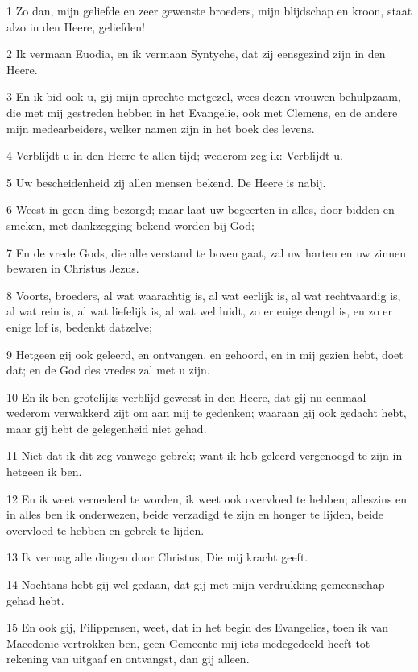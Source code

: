\par 1 Zo dan, mijn geliefde en zeer gewenste broeders, mijn blijdschap en kroon, staat alzo in den Heere, geliefden!
\par 2 Ik vermaan Euodia, en ik vermaan Syntyche, dat zij eensgezind zijn in den Heere.
\par 3 En ik bid ook u, gij mijn oprechte metgezel, wees dezen vrouwen behulpzaam, die met mij gestreden hebben in het Evangelie, ook met Clemens, en de andere mijn medearbeiders, welker namen zijn in het boek des levens.
\par 4 Verblijdt u in den Heere te allen tijd; wederom zeg ik: Verblijdt u.
\par 5 Uw bescheidenheid zij allen mensen bekend. De Heere is nabij.
\par 6 Weest in geen ding bezorgd; maar laat uw begeerten in alles, door bidden en smeken, met dankzegging bekend worden bij God;
\par 7 En de vrede Gods, die alle verstand te boven gaat, zal uw harten en uw zinnen bewaren in Christus Jezus.
\par 8 Voorts, broeders, al wat waarachtig is, al wat eerlijk is, al wat rechtvaardig is, al wat rein is, al wat liefelijk is, al wat wel luidt, zo er enige deugd is, en zo er enige lof is, bedenkt datzelve;
\par 9 Hetgeen gij ook geleerd, en ontvangen, en gehoord, en in mij gezien hebt, doet dat; en de God des vredes zal met u zijn.
\par 10 En ik ben grotelijks verblijd geweest in den Heere, dat gij nu eenmaal wederom verwakkerd zijt om aan mij te gedenken; waaraan gij ook gedacht hebt, maar gij hebt de gelegenheid niet gehad.
\par 11 Niet dat ik dit zeg vanwege gebrek; want ik heb geleerd vergenoegd te zijn in hetgeen ik ben.
\par 12 En ik weet vernederd te worden, ik weet ook overvloed te hebben; alleszins en in alles ben ik onderwezen, beide verzadigd te zijn en honger te lijden, beide overvloed te hebben en gebrek te lijden.
\par 13 Ik vermag alle dingen door Christus, Die mij kracht geeft.
\par 14 Nochtans hebt gij wel gedaan, dat gij met mijn verdrukking gemeenschap gehad hebt.
\par 15 En ook gij, Filippensen, weet, dat in het begin des Evangelies, toen ik van Macedonie vertrokken ben, geen Gemeente mij iets medegedeeld heeft tot rekening van uitgaaf en ontvangst, dan gij alleen.
